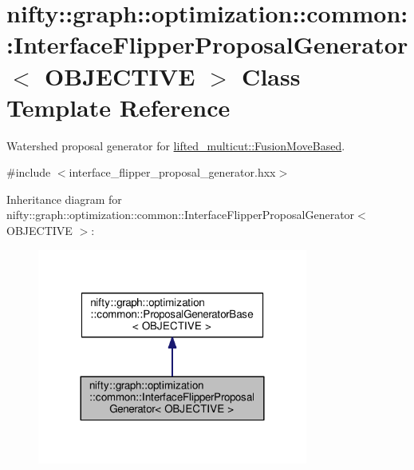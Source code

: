 \hypertarget{classnifty_1_1graph_1_1optimization_1_1common_1_1InterfaceFlipperProposalGenerator}{}\section{nifty\+:\+:graph\+:\+:optimization\+:\+:common\+:\+:Interface\+Flipper\+Proposal\+Generator$<$ O\+B\+J\+E\+C\+T\+I\+V\+E $>$ Class Template Reference}
\label{classnifty_1_1graph_1_1optimization_1_1common_1_1InterfaceFlipperProposalGenerator}


Watershed proposal generator for \hyperlink{classnifty_1_1graph_1_1optimization_1_1lifted__multicut_1_1FusionMoveBased}{lifted\+\_\+multicut\+::\+Fusion\+Move\+Based}.  




{\ttfamily \#include $<$interface\+\_\+flipper\+\_\+proposal\+\_\+generator.\+hxx$>$}



Inheritance diagram for nifty\+:\+:graph\+:\+:optimization\+:\+:common\+:\+:Interface\+Flipper\+Proposal\+Generator$<$ O\+B\+J\+E\+C\+T\+I\+V\+E $>$\+:\nopagebreak
\begin{figure}[H]
\begin{center}
\leavevmode
\includegraphics[width=252pt]{classnifty_1_1graph_1_1optimization_1_1common_1_1InterfaceFlipperProposalGenerator__inherit__graph}
\end{center}
\end{figure}


